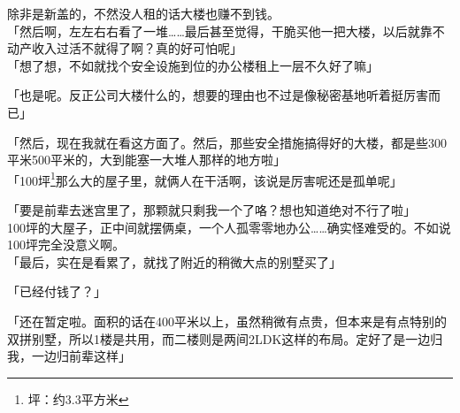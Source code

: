 除非是新盖的，不然没人租的话大楼也赚不到钱。\\

「然后啊，左左右右看了一堆……最后甚至觉得，干脆买他一把大楼，以后就靠不动产收入过活不就得了啊？真的好可怕呢」\\

「想了想，不如就找个安全设施到位的办公楼租上一层不久好了嘛」

「也是呢。反正公司大楼什么的，想要的理由也不过是像秘密基地听着挺厉害而已」

「然后，现在我就在看这方面了。然后，那些安全措施搞得好的大楼，都是些300平米500平米的，大到能塞一大堆人那样的地方啦」\\

「100坪\footnote{坪：约3.3平方米}那么大的屋子里，就俩人在干活啊，该说是厉害呢还是孤单呢」

「要是前辈去迷宫里了，那颗就只剩我一个了咯？想也知道绝对不行了啦」\\

100坪的大屋子，正中间就摆俩桌，一个人孤零零地办公……确实怪难受的。不如说100坪完全没意义啊。\\

「最后，实在是看累了，就找了附近的稍微大点的别墅买了」

「已经付钱了？」

「还在暂定啦。面积的话在400平米以上，虽然稍微有点贵，但本来是有点特别的双拼别墅，所以1楼是共用，而二楼则是两间2LDK这样的布局。定好了是一边归我，一边归前辈这样」


